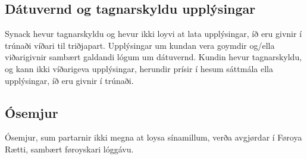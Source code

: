 \subsection{Dátuvernd og tagnarskyldu upplýsingar}
Synack hevur tagnarskyldu og hevur ikki loyvi at lata upplýsingar, íð eru givnir í trúnaði víðari til triðjapart. Upplýsingar um kundan vera goymdir og/ella viðarigivnir sambært galdandi lógum um dátuvernd. Kundin hevur tagnarskyldu, og kann ikki víðarigeva upplýsingar, herundir prísir í hesum sáttmála ella upplýsingar, íð eru givnir í trúnaði.

\subsection{Ósemjur}
Ósemjur, sum partarnir ikki megna at loysa sínamillum, verða avgjørdar í Føroya Rætti, sambært føroyskari lóggávu.

